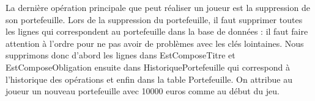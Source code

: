 La dernière opération principale que peut réaliser un joueur est la suppression de son portefeuille. Lors de la suppression du portefeuille, il faut supprimer toutes les lignes qui correspondent au portefeuille dans la base de données : il faut faire attention à l'ordre pour ne pas avoir de problèmes avec les clés lointaines. Nous supprimons donc d'abord les lignes dans EstComposeTitre et EstComposeObligation ensuite dans HistoriquePortefeuille qui correspond à l'historique des opérations et enfin dans la table Portefeuille. On attribue au joueur un nouveau portefeuille avec 10000 euros comme au début du jeu. 